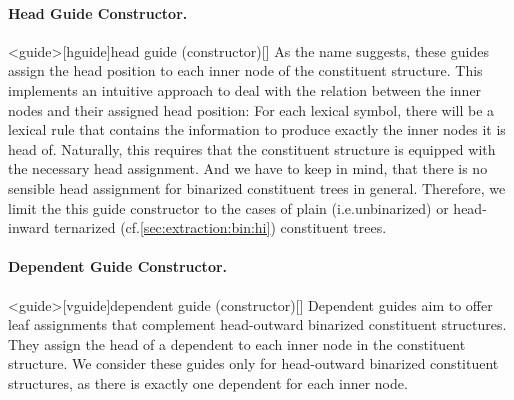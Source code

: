 \documentclass[../../document.tex]{subfiles}
\begin{document}
    \paragraph{Head Guide Constructor.}<guide>[hguide]{head guide (constructor)}[]
    As the name suggests, these guides assign the head position to each inner node of the constituent structure.
    This implements an intuitive approach to deal with the relation between the inner nodes and their assigned head position: For each lexical symbol, there will be a lexical rule that contains the information to produce exactly the inner nodes it is head of.
    Naturally, this requires that the constituent structure is equipped with the necessary head assignment.
    And we have to keep in mind, that there is no sensible head assignment for binarized constituent trees in general.
    Therefore, we limit the this guide constructor to the cases of plain (i.e.\@ unbinarized) or head-inward ternarized (cf.\@ \cref{sec:extraction:bin:hi}) constituent trees.

    \paragraph{Dependent Guide Constructor.}<guide>[vguide]{dependent guide (constructor)}[]
    Dependent guides aim to offer leaf assignments that complement head-outward binarized constituent structures.
    They assign the head of a dependent to each inner node in the constituent structure.
    We consider these guides only for head-outward binarized constituent structures, as there is exactly one dependent for each inner node.
\end{document}
